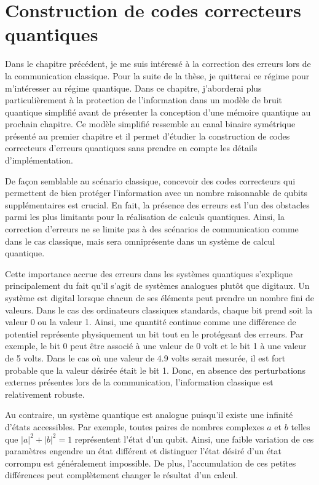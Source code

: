 \begin{comment}
\end{comment}

\chapter{Construction de codes correcteurs quantiques}
\label{chap:construction_codes}

Dans le chapitre précédent, 
je me suis intéressé à la correction des erreurs lors de la communication classique.
Pour la suite de la thèse,
je quitterai ce régime pour m'intéresser au régime quantique.
Dans ce chapitre, 
j'aborderai plus particulièrement à la protection de l'information 
dans un modèle de bruit quantique simplifié avant de présenter la conception d'une mémoire 
quantique au prochain chapitre.
Ce modèle simplifié ressemble au canal binaire symétrique présenté au premier chapitre
et il permet d'étudier la construction de codes correcteurs d'erreurs quantiques sans prendre en compte les détails d'implémentation.

De façon semblable au scénario classique,
concevoir des codes correcteurs qui permettent de bien protéger l'information avec un nombre raisonnable de qubits supplémentaires est crucial.
En fait,
la présence des erreurs est l'un des obstacles parmi les plus
limitants pour la réalisation de calculs quantiques.
Ainsi, 
la correction d'erreurs ne se limite pas à des scénarios de communication 
comme dans le cas classique,
mais sera omniprésente dans un système de calcul quantique.

Cette importance accrue des erreurs dans les systèmes quantiques s'explique
principalement du fait qu'il s'agit de systèmes analogues plutôt que digitaux.
Un système est digital lorsque chacun de ses éléments peut prendre un nombre fini
de valeurs. 
Dans le cas des ordinateurs classiques standards,
chaque bit prend soit la valeur 0 ou la valeur 1.
Ainsi,
une quantité continue comme une différence de potentiel représente physiquement un bit tout en le protégeant des erreurs.
Par exemple,
le bit 0 peut être associé à une valeur de 0 volt et le bit 1 à une valeur de 5 volts.
Dans le cas où une valeur de 4.9 volts serait mesurée, il est fort probable que 
la valeur désirée était le bit 1.
Donc, en absence des perturbations externes présentes lors de la communication,
l'information classique est relativement robuste.

Au contraire, un système quantique est analogue puisqu'il existe une infinité d'états accessibles.
Par exemple, toutes paires de nombres complexes $a$ et $b$ telles que $|a|^2 + |b|^2 = 1$
représentent l'état d'un qubit.
Ainsi, 
une faible variation de ces paramètres engendre un état différent
et distinguer l'état désiré d'un état corrompu est généralement impossible.
De plus, l'accumulation de ces petites différences peut complètement
changer le résultat d'un calcul.

